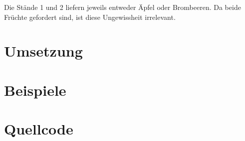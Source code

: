 \documentclass[a4paper,10pt,ngerman]{scrartcl}
\begin{document}
Die Stände 1 und 2 liefern jeweils entweder Äpfel oder Brombeeren.
Da beide Früchte gefordert sind, ist diese Ungewissheit irrelevant.

\section{Umsetzung}

\section{Beispiele}

\section{Quellcode}
\end{document}
